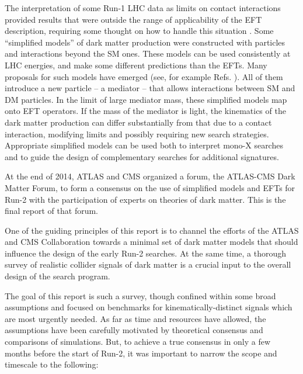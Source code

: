 The interpretation of some Run-1 LHC data as limits on contact interactions
provided results that were outside the range of applicability of the EFT
description, requiring some thought on how to handle this situation \cite{Bai:2010hh,Kopp:2011eu,Fox:2011fx,Fox:2011pm,Shoemaker:2011vi,Busoni:2013lha}.
Some ``simplified models'' \cite{Alwall:2008ag,Goodman:2011jq,Alves:2011wf}
of dark matter production
were constructed with particles and interactions beyond the SM ones.
These models can be used consistently at LHC energies,
and make some different predictions than the EFTs.
Many proposals for such models have emerged (see, for example
Refs. \cite{An:2012va,An:2012ue,Tait:2013,Buchmueller:2013dya,Bai:2013iqa,Bai:2014osa,An:2013xka,Yavin:14092893,Malik:2014ggr,Harris:2014hga,Buckley:2014fba,Haisch:2015ioa}). 
All of them introduce a new particle -- a mediator -- that allows
interactions between SM and DM particles.
In the limit of large mediator mass, these simplified models map onto
EFT operators.
If the mass of the mediator is light, the kinematics of the
dark matter production can differ substantially from that due to a contact
interaction, modifying limits and possibly requiring new search strategies.
Appropriate simplified models can be used both to
interpret mono-X searches and to guide the design of complementary
searches for additional signatures.

At the end of 2014, ATLAS and CMS organized a forum, the ATLAS-CMS Dark
Matter Forum, to form a consensus on the use of simplified models
and EFTs for Run-2 with the participation of experts on
theories of dark matter. This is the final report of that forum.

One of the guiding principles of this report is to channel the efforts
of the ATLAS and CMS Collaboration towards a minimal set of dark
matter models that should influence the design of the early Run-2
searches. At the same time, a thorough survey of realistic collider
signals of dark matter is a crucial input to the overall design of the
search program.

The goal of this report is such a survey, though confined within some
broad assumptions and focused on benchmarks for kinematically-distinct
signals which are most urgently needed. As far as time and resources
have allowed, the assumptions have been carefully motivated by
theoretical consensus and comparisons of simulations. But, to achieve a
true consensus in only a few months before the start of Run-2, it was
important to narrow the scope and timescale to the following:

